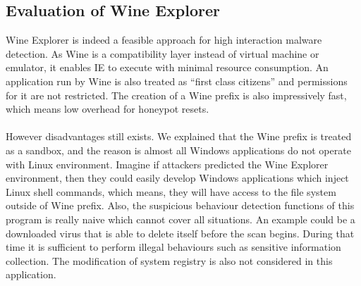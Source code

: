 \subsection{Evaluation of Wine Explorer}
Wine Explorer is indeed a feasible approach for high interaction malware 
detection. As Wine is a compatibility layer instead of virtual machine or 
emulator, it enables IE to execute with minimal resource consumption. 
An application run by Wine is also 
treated as ``first class citizens''\cite{wineperformance} and 
permissions for it are not 
restricted. The creation of a Wine prefix is also impressively fast, which 
means low overhead for honeypot resets. 
\paragraph{}
However disadvantages still exists. We explained that the Wine prefix is treated
as a sandbox, and the reason is almost all Windows applications do not operate 
with Linux environment. Imagine if attackers predicted the Wine Explorer 
environment, then they could easily develop Windows applications which inject 
Linux shell commands, which means, they will have access to the file system 
outside of Wine prefix. Also, the suspicious behaviour detection functions of 
this program is really naive which cannot cover all situations. An example 
could 
be a downloaded virus that is able to delete itself before the scan begins. 
During that time it is sufficient to perform illegal behaviours such as 
sensitive information collection. The modification of system 
registry is also not considered in this application. 
